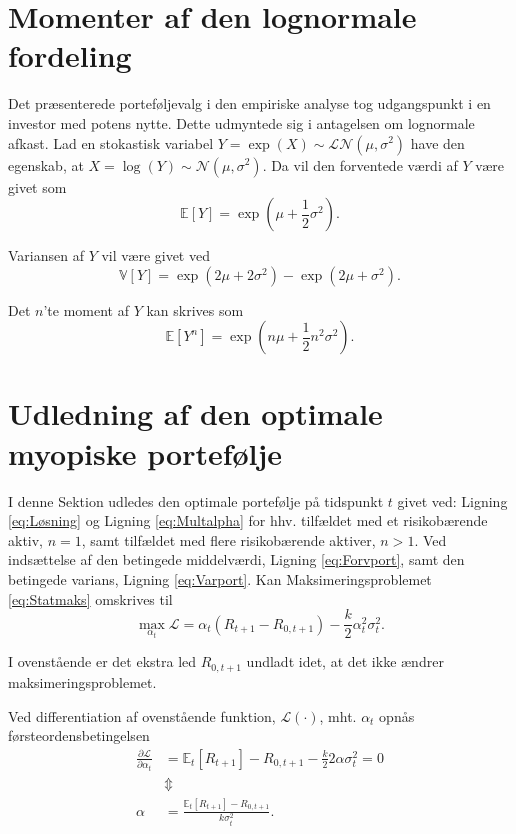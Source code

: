 \documentclass[
  a4paper,
  oneside]{memoir}
\begin{document}
\hypertarget{momlognorm}{%
\section{Momenter af den lognormale fordeling}\label{momlognorm}}

Det præsenterede porteføljevalg i den empiriske analyse tog udgangspunkt i en investor med potens nytte. Dette udmyntede sig i antagelsen om lognormale afkast. Lad en stokastisk variabel \(Y=\exp(X)\sim \mathcal{LN}(\mu,\sigma^2)\) have den egenskab, at \(X=\log(Y)\sim\mathcal{N}(\mu,\sigma^2)\). Da vil den forventede værdi af \(Y\) være givet som
\[\mathbb{E}[Y]=\exp\left(\mu+\frac{1}{2}\sigma^2\right).\]

Variansen af \(Y\) vil være givet ved
\[\mathbb{V}\left[Y\right]=\exp\left(2\mu+2\sigma^2\right)-\exp\left(2\mu+\sigma^2\right).\]

Det \(n\)'te moment af \(Y\) kan skrives som
\[\mathbb{E}\left[Y^n\right]=\exp\left(n\mu + \frac{1}{2}n^2\sigma^2\right).\]

\hypertarget{udlmyo}{%
\section{Udledning af den optimale myopiske portefølje}\label{udlmyo}}

I denne Sektion udledes den optimale portefølje på tidspunkt \(t\) givet ved: Ligning \eqref{eq:Løsning} og Ligning \eqref{eq:Multalpha} for hhv. tilfældet med et risikobærende aktiv, \(n=1\), samt tilfældet med flere risikobærende aktiver, \(n>1\). Ved indsættelse af den betingede middelværdi, Ligning \eqref{eq:Forvport}, samt den betingede varians, Ligning \eqref{eq:Varport}. Kan Maksimeringsproblemet \eqref{eq:Statmaks} omskrives til
\[\max_{\alpha_t} \mathcal{L}=\alpha_t\left(R_{t+1} - R_{0,t+1}\right)-\frac{k}{2}\alpha_t^2\sigma_t^2.\]

I ovenstående er det ekstra led \(R_{0,t+1}\) undladt idet, at det ikke ændrer maksimeringsproblemet.

Ved differentiation af ovenstående funktion, \(\mathcal{L}(\cdot)\), mht. \(\alpha_t\) opnås førsteordensbetingelsen
\begin{align*}
\frac{\partial \mathcal{L}}{\partial \alpha_t} &= \mathbb{E}_t\left[R_{t+1}\right] - R_{0,t+1} - \frac{k}{2}2\alpha\sigma_t^2=0\\
&\Updownarrow\\
\alpha&=\frac{\mathbb{E}_t\left[R_{t+1}\right]-R_{0,t+1}}{k\sigma_t^2}.
\end{align*}
\end{document}
